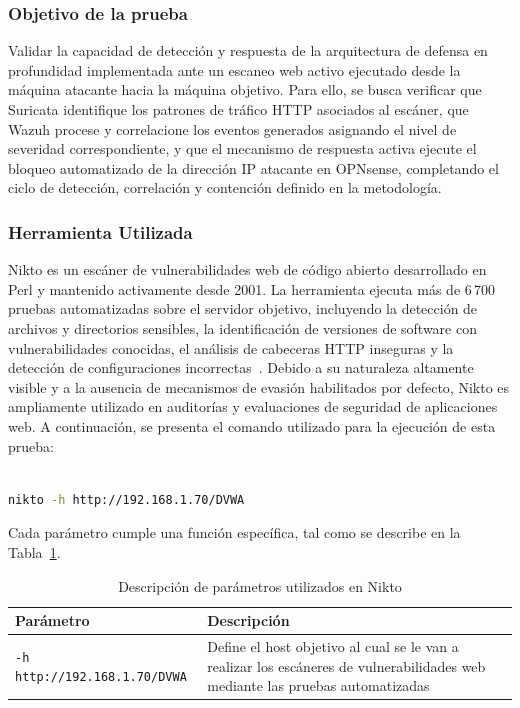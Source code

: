 \subsubsection{Objetivo de la prueba}
\noindent

Validar la capacidad de detección y respuesta de la arquitectura de defensa en profundidad implementada ante un escaneo web activo 
ejecutado desde la máquina atacante hacia la máquina objetivo. Para ello, se busca verificar que Suricata identifique los patrones de 
tráfico HTTP asociados al escáner, que Wazuh procese y correlacione los eventos generados asignando el nivel de severidad correspondiente, 
y que el mecanismo de respuesta activa ejecute el bloqueo automatizado de la dirección IP atacante en OPNsense, completando el ciclo de 
detección, correlación y contención definido en la metodología.

\subsubsection{Herramienta Utilizada}
\noindent

Nikto es un escáner de vulnerabilidades web de código abierto desarrollado en Perl y mantenido activamente desde 2001. La herramienta 
ejecuta más de 6\,700 pruebas automatizadas sobre el servidor objetivo, incluyendo la detección de archivos y directorios sensibles, la 
identificación de versiones de software con vulnerabilidades conocidas, el análisis de cabeceras HTTP inseguras y la detección de 
configuraciones incorrectas~\cite{NiktoDocs}. Debido a su naturaleza altamente visible y a la ausencia de mecanismos de evasión 
habilitados por defecto, Nikto es ampliamente utilizado en auditorías y evaluaciones de seguridad de aplicaciones web. A continuación, se 
presenta el comando utilizado para la ejecución de esta prueba:

\begin{lstlisting}[language=bash, caption={Comando utilizado para la ejecución de Nikto}, label={lst:nikto}]

nikto -h http://192.168.1.70/DVWA

\end{lstlisting}

Cada parámetro cumple una función específica, tal como se describe en la Tabla~\ref{tab:parametros_nikto}.

\begin{table}[H]
	\centering
	\caption{Descripción de parámetros utilizados en Nikto}\label{tab:parametros_nikto}
	\renewcommand{\arraystretch}{1.4}
	\begin{tabular}{|p{4.5cm}|p{8.5cm}|}
	\hline
	\rowcolor{gray!25}
	\centering \textbf{Parámetro} & \centering \textbf{Descripción} \tabularnewline
	\hline

	\centering \texttt{-h http://192.168.1.70/DVWA} &
	Define el host objetivo al cual se le van a realizar los escáneres de vulnerabilidades web mediante las pruebas automatizadas
	\tabularnewline
	\hline
	\end{tabular}
\end{table}

